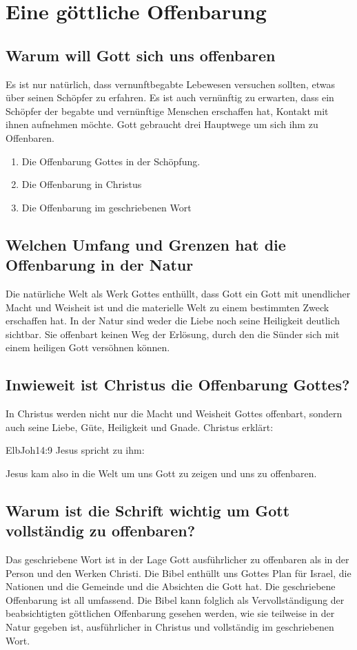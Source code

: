 \section{Eine göttliche Offenbarung}
\subsection{Warum will Gott sich uns offenbaren}
Es ist nur natürlich, dass vernunftbegabte Lebewesen versuchen sollten, etwas über seinen Schöpfer zu erfahren. Es ist auch vernünftig zu erwarten, dass ein Schöpfer der begabte und vernünftige Menschen erschaffen hat, Kontakt mit ihnen aufnehmen möchte. Gott gebraucht drei Hauptwege um sich ihm zu Offenbaren.
\begin{enumerate}
	\item Die Offenbarung Gottes in der Schöpfung.
	\item Die Offenbarung in Christus
	\item Die Offenbarung im geschriebenen Wort
\end{enumerate}
\subsection{Welchen Umfang und Grenzen hat die Offenbarung in der Natur}
Die natürliche Welt als Werk Gottes enthüllt, dass Gott ein Gott mit unendlicher Macht und Weisheit ist und die materielle Welt zu einem bestimmten Zweck erschaffen hat. In der Natur sind weder die Liebe noch seine Heiligkeit deutlich sichtbar. Sie offenbart keinen Weg der Erlösung, durch den die Sünder sich mit einem heiligen Gott versöhnen können.
\subsection{Inwieweit ist Christus die Offenbarung Gottes?}
In Christus werden nicht nur die Macht und Weisheit Gottes offenbart, sondern auch seine Liebe, Güte, Heiligkeit und Gnade. Christus erklärt:
\begin{bibeltext}{Elb}{Joh}{14:9}
	Jesus spricht zu ihm: 
\end{bibeltext} 
Jesus kam also in die Welt um uns Gott zu zeigen und uns zu offenbaren.
\subsection{Warum ist die Schrift wichtig um Gott vollständig zu offenbaren?}
Das geschriebene Wort ist in der Lage Gott ausführlicher zu offenbaren als in der Person und den Werken Christi. Die Bibel enthüllt uns Gottes Plan für Israel, die Nationen und die Gemeinde und die Absichten die Gott hat. Die geschriebene Offenbarung ist all umfassend. Die Bibel kann folglich als Vervollständigung der beabsichtigten göttlichen Offenbarung gesehen werden, wie sie teilweise in der Natur gegeben ist, ausführlicher in Christus und vollständig im geschriebenen Wort. 
